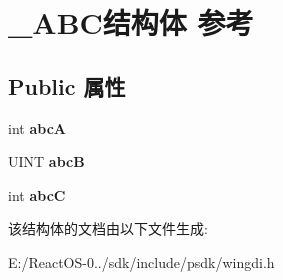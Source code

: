 \hypertarget{struct___a_b_c}{}\section{\+\_\+\+A\+B\+C结构体 参考}
\label{struct___a_b_c}
\subsection*{Public 属性}
\begin{DoxyCompactItemize}
\item 
\mbox{\label{struct___a_b_c_a7db4c17355d5fb0429f0ed4451790b43}} 
int {\bfseries abcA}
\item 
\mbox{\label{struct___a_b_c_abac199d51203c728faacd77b584bfa5f}} 
U\+I\+NT {\bfseries abcB}
\item 
\mbox{\label{struct___a_b_c_ac0b7fc1624030214c83b178d33401556}} 
int {\bfseries abcC}
\end{DoxyCompactItemize}


该结构体的文档由以下文件生成\+:\begin{DoxyCompactItemize}
\item 
E\+:/\+React\+O\+S-\/0../sdk/include/psdk/wingdi.\+h\end{DoxyCompactItemize}
